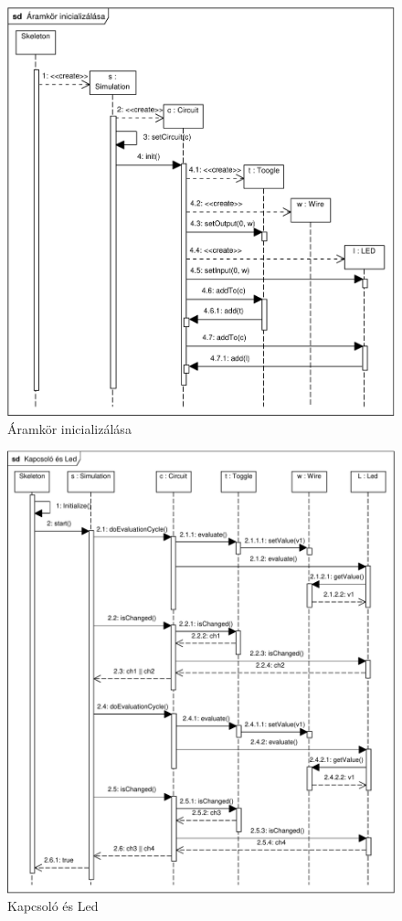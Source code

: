 \begin{figure}[H]
\begin{center}
\includegraphics[width=17cm]{chapters/chapter05/imgs/init.pdf}
\caption{Áramkör inicializálása}
\label{fig:init}
\end{center}
\end{figure}

\begin{figure}[H]
\begin{center}
\includegraphics[width=17cm]{chapters/chapter05/imgs/test1.pdf}
\caption{Kapcsoló és Led}
\label{fig:init}
\end{center}
\end{figure}

